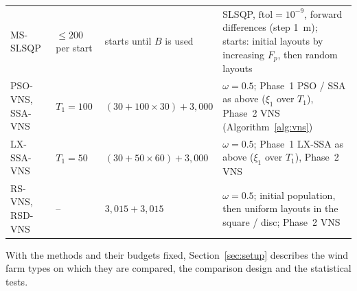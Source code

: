 \begin{table}[!t]
\begin{tabular}{@{}>{\raggedright\arraybackslash}p{}>{\raggedright\arraybackslash}p{}>{\raggedright\arraybackslash}p{}>{\raggedright\arraybackslash}p{}@{}}
MS-SLSQP & $\le200$ per start & starts until $B$ is used & SLSQP, $\mathrm{ftol}=10^{-9}$, forward differences (step 1~m); starts: initial layouts by increasing $F_p$, then random layouts \\
PSO-VNS, SSA-VNS & $T_1=100$ & $(30+100\times30)+3{,}000$ & $\omega=0.5$; Phase~1 PSO / SSA as above ($\xi_1$ over $T_1$), Phase~2 VNS (Algorithm~\ref{alg:vns}) \\
LX-SSA-VNS & $T_1=50$ & $(30+50\times60)+3{,}000$ & $\omega=0.5$; Phase~1 LX-SSA as above ($\xi_1$ over $T_1$), Phase~2 VNS \\
RS-VNS, RSD-VNS & -- & $3{,}015+3{,}015$ & $\omega=0.5$; initial population, then uniform layouts in the square / disc; Phase~2 VNS \\
\bottomrule
\end{tabular}
\end{table}
With the methods and their budgets fixed, Section~\ref{sec:setup} describes the wind farm types on which they are compared, the comparison design and the statistical tests.
